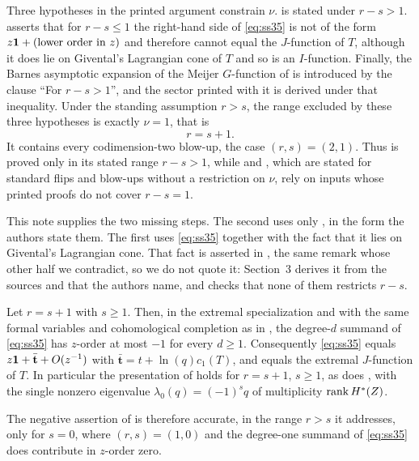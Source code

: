 Three hypotheses in the printed argument constrain \(\nu\).
\cite[Theorem~4.4]{SS} is stated under \(r-s>1\).
\cite[Remark~4.5(3)]{SS} asserts that for \(r-s\le1\) the right-hand side of
\eqref{eq:ss35} is not of the form \(z\mathbf 1+(\text{lower order in }z)\) and
therefore cannot equal the \(J\)-function of \(T\), although it does lie on
Givental's Lagrangian cone of \(T\) and so is an \(I\)-function.  Finally,
the Barnes asymptotic expansion of the Meijer \(G\)-function of
\cite[Lemma~7.4]{SS} is introduced by the clause ``For \(r-s>1\)'', and the
sector \cite[(64)]{SS} printed with it is derived under that inequality.
Under the standing assumption \(r>s\), the range excluded by these three
hypotheses is exactly \(\nu=1\), that is
\[
  r=s+1 .
\]
It contains every codimension-two blow-up, the case \((r,s)=(2,1)\).  Thus
\cite[Theorem~1.2]{SS} is proved only in its stated range \(r-s>1\), while
\cite[Theorems~1.4, 9.9 and~9.14]{SS} and \cite[Corollary~1.5]{SS}, which are
stated for standard flips and blow-ups without a restriction on \(\nu\), rely
on inputs whose printed proofs do not cover \(r-s=1\).

This note supplies the two missing steps.  The second uses only
\cite[Theorems~A.1 and~A.2]{SS}, in the form the authors state them.  The first uses
\eqref{eq:ss35} together with the fact that it lies on Givental's Lagrangian
cone.  That fact is asserted in \cite[Remark~4.5(3)]{SS}, the same remark
whose other half we contradict, so we do not quote it: Section~3 derives it
from the sources \cite{Brown} and \cite{CoatesGivental} that the authors
name, and checks that none of them restricts \(r-s\).

\begin{theorem}
  \label{thm:normalization}
  Let \(r=s+1\) with \(s\ge1\).  Then, in the extremal specialization
  \cite[(33)]{SS} and with the same formal variables and cohomological
  completion as in \cite[Theorem~4.4]{SS}, the degree-\(d\) summand of
  \eqref{eq:ss35} has \(z\)-order at most \(-1\) for every \(d\ge1\).
  Consequently \eqref{eq:ss35} equals \(z\mathbf 1+\bar{\mathbf t}+O(z^{-1})\)
  with \(\bar{\mathbf t}=t+\ln(q)c_{1}(T)\), and equals the extremal
  \(J\)-function of \(T\).  In particular the presentation \cite[(37)]{SS}
  of \cite[Theorem~4.6]{SS} holds for \(r=s+1\),
  \(s\ge1\), as does \cite[Theorem~1.2]{SS}, with the single nonzero
  eigenvalue \(\lambda_{0}(q)=(-1)^{s}q\) of multiplicity
  \(\operatorname{rank} H^{*}(Z)\).
\end{theorem}

The negative assertion of \cite[Remark~4.5(3)]{SS} is therefore accurate, in
the range \(r>s\) it addresses, only for \(s=0\), where \((r,s)=(1,0)\) and
the degree-one summand of \eqref{eq:ss35} does contribute in \(z\)-order
zero.

